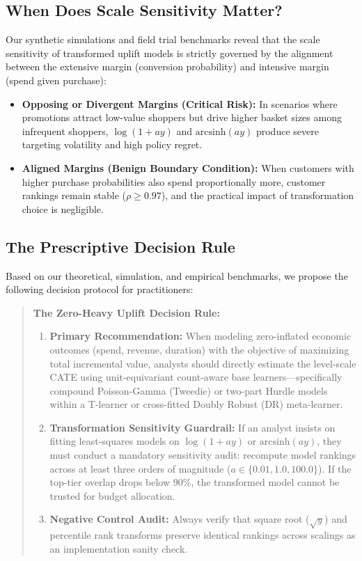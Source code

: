 \documentclass[conference]{IEEEtran}
\begin{document}
\subsection{When Does Scale Sensitivity Matter?}
Our synthetic simulations and field trial benchmarks reveal that the scale sensitivity of transformed uplift models is strictly governed by the alignment between the extensive margin (conversion probability) and intensive margin (spend given purchase):
\begin{itemize}
    \item \textbf{Opposing or Divergent Margins (Critical Risk):} In scenarios where promotions attract low-value shoppers but drive higher basket sizes among infrequent shoppers, $\log(1+ay)$ and $\text{arcsinh}(ay)$ produce severe targeting volatility and high policy regret.
    \item \textbf{Aligned Margins (Benign Boundary Condition):} When customers with higher purchase probabilities also spend proportionally more, customer rankings remain stable ($\rho \ge 0.97$), and the practical impact of transformation choice is negligible.
\end{itemize}

\subsection{The Prescriptive Decision Rule}
Based on our theoretical, simulation, and empirical benchmarks, we propose the following decision protocol for practitioners:
\begin{quote}
\textbf{The Zero-Heavy Uplift Decision Rule:}
\begin{enumerate}
    \item \textbf{Primary Recommendation:} When modeling zero-inflated economic outcomes (spend, revenue, duration) with the objective of maximizing total incremental value, analysts should directly estimate the level-scale CATE using unit-equivariant count-aware base learners---specifically compound Poisson-Gamma (Tweedie) or two-part Hurdle models within a T-learner or cross-fitted Doubly Robust (DR) meta-learner.
    \item \textbf{Transformation Sensitivity Guardrail:} If an analyst insists on fitting least-squares models on $\log(1+ay)$ or $\text{arcsinh}(ay)$, they must conduct a mandatory sensitivity audit: recompute model rankings across at least three orders of magnitude ($a \in \{0.01, 1.0, 100.0\}$). If the top-tier overlap drops below $90\%$, the transformed model cannot be trusted for budget allocation.
    \item \textbf{Negative Control Audit:} Always verify that square root ($\sqrt{y}$) and percentile rank transforms preserve identical rankings across scalings as an implementation sanity check.
\end{enumerate}
\end{quote}
\end{document}
